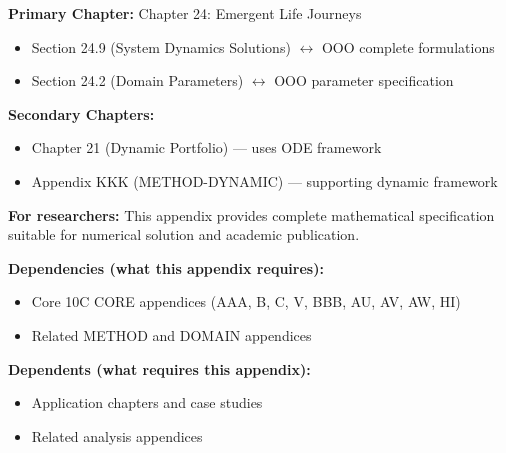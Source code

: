\begin{tcolorbox}[colback=purple!5!white, colframe=purple!75!black, title=Chapter Linkage]

\textbf{Primary Chapter:} Chapter 24: Emergent Life Journeys
\begin{itemize}[nosep]
\item Section 24.9 (System Dynamics Solutions) $\leftrightarrow$ OOO complete formulations
\item Section 24.2 (Domain Parameters) $\leftrightarrow$ OOO parameter specification
\end{itemize}

\textbf{Secondary Chapters:}
\begin{itemize}[nosep]
\item Chapter 21 (Dynamic Portfolio) --- uses ODE framework
\item Appendix KKK (METHOD-DYNAMIC) --- supporting dynamic framework
\end{itemize}

\textbf{For researchers:} This appendix provides complete mathematical specification suitable for numerical solution and academic publication.

\end{tcolorbox}


\begin{tcolorbox}[colback=blue!5!white, colframe=blue!75!black,
    title=Cross-Reference Map]

\textbf{Dependencies (what this appendix requires):}
\begin{itemize}[nosep]
    \item Core 10C CORE appendices (AAA, B, C, V, BBB, AU, AV, AW, HI)
    \item Related METHOD and DOMAIN appendices
\end{itemize}

\textbf{Dependents (what requires this appendix):}
\begin{itemize}[nosep]
    \item Application chapters and case studies
    \item Related analysis appendices
\end{itemize}

\end{tcolorbox}


